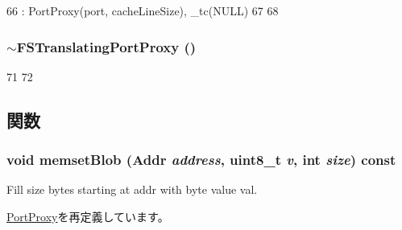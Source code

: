\begin{DoxyCode}
66     : PortProxy(port, cacheLineSize), _tc(NULL)
67 {
68 }
\end{DoxyCode}
\hypertarget{classFSTranslatingPortProxy_ac9bae2fa46b2f91ee55742330aeeee61}{
\subsubsection[{$\sim$FSTranslatingPortProxy}]{\setlength{\rightskip}{0pt plus 5cm}$\sim${\bf FSTranslatingPortProxy} ()}}
\label{classFSTranslatingPortProxy_ac9bae2fa46b2f91ee55742330aeeee61}



\begin{DoxyCode}
71 {
72 }
\end{DoxyCode}


\subsection{関数}
\hypertarget{classFSTranslatingPortProxy_aaaf1f49b0b6f48f1af72af03caf7fef7}{
\subsubsection[{memsetBlob}]{\setlength{\rightskip}{0pt plus 5cm}void memsetBlob ({\bf Addr} {\em address}, \/  uint8\_\-t {\em v}, \/  int {\em size}) const}}
\label{classFSTranslatingPortProxy_aaaf1f49b0b6f48f1af72af03caf7fef7}
Fill size bytes starting at addr with byte value val. 

\hyperlink{classPortProxy_ad68c64ee0acd471129b53bbfd59a2f9a}{PortProxy}を再定義しています。


